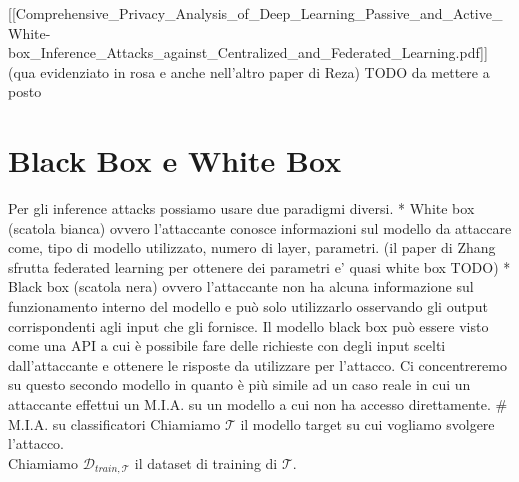{[}{[}Comprehensive\_Privacy\_Analysis\_of\_Deep\_Learning\_Passive\_and\_Active\_White-box\_Inference\_Attacks\_against\_Centralized\_and\_Federated\_Learning.pdf{]}{]}
(qua evidenziato in rosa e anche nell'altro paper di Reza) TODO da
mettere a posto

\section{Black Box e White Box}\label{black-box-e-white-box}

Per gli inference attacks possiamo usare due paradigmi diversi. * White
box (scatola bianca) ovvero l'attaccante conosce informazioni sul
modello da attaccare come, tipo di modello utilizzato, numero di layer,
parametri. (il paper di Zhang sfrutta federated learning per ottenere
dei parametri e' quasi white box TODO) * Black box (scatola nera) ovvero
l'attaccante non ha alcuna informazione sul funzionamento interno del
modello e può solo utilizzarlo osservando gli output corrispondenti agli
input che gli fornisce. Il modello black box può essere visto come una
API a cui è possibile fare delle richieste con degli input scelti
dall'attaccante e ottenere le risposte da utilizzare per l'attacco. Ci
concentreremo su questo secondo modello in quanto è più simile ad un
caso reale in cui un attaccante effettui un M.I.A. su un modello a cui
non ha accesso direttamente. \# M.I.A. su classificatori Chiamiamo
\(\mathcal T\) il modello target su cui vogliamo svolgere l'attacco.\\
Chiamiamo \(\mathcal D_{train,\mathcal T}\) il dataset di training di
\(\mathcal T\).

